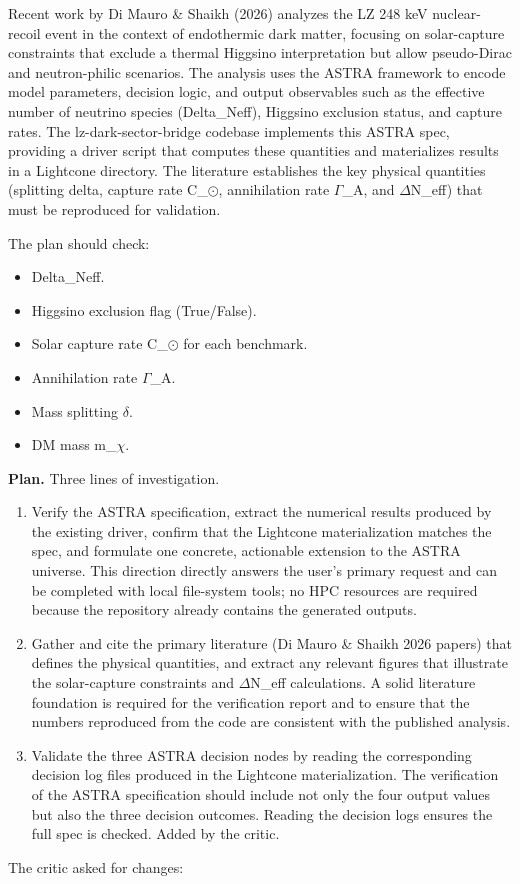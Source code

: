 \documentclass[11pt,a4paper]{article}
\begin{document}
Recent work by Di Mauro \& Shaikh (2026) analyzes the LZ 248 keV nuclear-recoil event in the context of endothermic dark matter, focusing on solar-capture constraints that exclude a thermal Higgsino interpretation but allow pseudo-Dirac and neutron-philic scenarios. The analysis uses the ASTRA framework to encode model parameters, decision logic, and output observables such as the effective number of neutrino species (Delta\_Neff), Higgsino exclusion status, and capture rates. The lz-dark-sector-bridge codebase implements this ASTRA spec, providing a driver script that computes these quantities and materializes results in a Lightcone directory. The literature establishes the key physical quantities (splitting delta, capture rate C\_$\odot$, annihilation rate $\Gamma$\_A, and $\Delta$N\_eff) that must be reproduced for validation.

The plan should check:

\begin{itemize}
  \item Delta\_Neff.
  \item Higgsino exclusion flag (True/False).
  \item Solar capture rate C\_$\odot$ for each benchmark.
  \item Annihilation rate $\Gamma$\_A.
  \item Mass splitting $\delta$.
  \item DM mass m\_$\chi$.
\end{itemize}
\textbf{Plan.} Three lines of investigation.

\begin{enumerate}
  \item Verify the ASTRA specification, extract the numerical results produced by the existing driver, confirm that the Lightcone materialization matches the spec, and formulate one concrete, actionable extension to the ASTRA universe. This direction directly answers the user's primary request and can be completed with local file-system tools; no HPC resources are required because the repository already contains the generated outputs.
  \item Gather and cite the primary literature (Di Mauro \& Shaikh 2026 papers) that defines the physical quantities, and extract any relevant figures that illustrate the solar-capture constraints and $\Delta$N\_eff calculations. A solid literature foundation is required for the verification report and to ensure that the numbers reproduced from the code are consistent with the published analysis.
  \item Validate the three ASTRA decision nodes by reading the corresponding decision log files produced in the Lightcone materialization. The verification of the ASTRA specification should include not only the four output values but also the three decision outcomes. Reading the decision logs ensures the full spec is checked. Added by the critic.
\end{enumerate}
The critic asked for changes:
\end{document}
